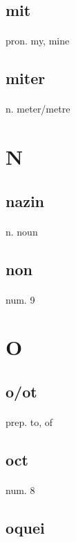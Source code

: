 \documentclass[UTF8]{article}
\begin{document}
    \subsection{mit}
    \paragraph{} pron. my, mine 
    \subsection{miter}
    \paragraph{} n. meter/metre 
    \newpage \section{N}
    \subsection{nazin}
    \paragraph{} n. noun 
    \subsection{non}
    \paragraph{} num. 9 
    \newpage \section{O}
    \subsection{o/ot}
    \paragraph{} prep. to, of 
    \subsection{oct}
    \paragraph{} num. 8 
    \subsection{oquei}
\end{document}
